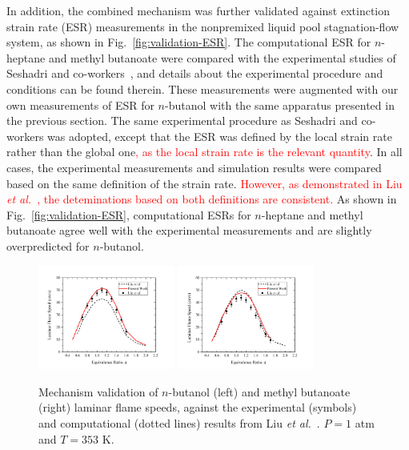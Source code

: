 \documentclass[review,3p,times]{elsarticleUS}
\begin{document}
In addition, the combined mechanism was further validated against extinction strain rate (ESR) measurements in the nonpremixed liquid pool stagnation-flow system, as shown in Fig.~\ref{fig:validation-ESR}.  The computational ESR for $n$-heptane and methyl butanoate were compared with the experimental studies of Seshadri and co-workers~\cite{seshadri08,niemann10}, and details about the experimental procedure and conditions can be found therein.  These measurements were augmented with our own measurements of ESR for $n$-butanol with the same apparatus presented in the previous section.  The same experimental procedure as Seshadri and co-workers was adopted, except that the ESR was defined by the local strain rate rather than the global one\textcolor{red}{, as the local strain rate is the relevant quantity}.  In all cases, the experimental measurements and simulation results were compared based on the same definition of the strain rate.  \textcolor{red}{However, as demonstrated in Liu \emph{et al.}~\cite{liu11b}, the deteminations based on both definitions are consistent.}  As shown in Fig.~\ref{fig:validation-ESR}, computational ESRs for $n$-heptane and methyl butanoate agree well with the experimental measurements and are slightly overpredicted for $n$-butanol.  

\begin{figure}[t]
  \centering
  \scriptsize
  \includegraphics[trim=4mm 8mm 30mm 20mm, clip=true, width=0.4\textwidth]{NB.png}
  \includegraphics[trim=4mm 8mm 30mm 20mm, clip=true, width=0.4\textwidth]{MB.png}
  \normalsize
  \vspace{-0.1in}
  \caption{Mechanism validation of $n$-butanol (left) and methyl butanoate (right) laminar flame speeds, against the experimental (symbols) and computational (dotted lines) results from Liu \emph{et al.}~\cite{liu11}. $P=1$ atm and $T=353$ K.}
  \label{fig:validation}
\end{figure}
\end{document}
